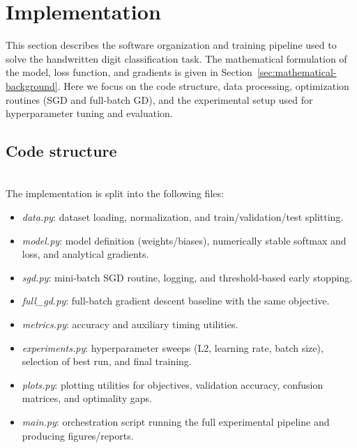 \section{Implementation}
\label{sec:implementation}

This section describes the software organization and training pipeline used to solve the handwritten digit classification task. The mathematical formulation of the model, loss function, and gradients is given in Section~\ref{sec:mathematical-background}. Here we focus on the code structure, data processing, optimization routines (SGD and full-batch GD), and the experimental setup used for hyperparameter tuning and evaluation.


\subsection{Code structure}\;\\
The implementation is split into the following files:
\begin{itemize}
    \item \emph{data.py}: dataset loading, normalization, and train/validation/test splitting.
    \item \emph{model.py}: model definition (weights/biases), numerically stable softmax and loss, and analytical gradients.
    \item \emph{sgd.py}: mini-batch SGD routine, logging, and threshold-based early stopping.
    \item \emph{full\_gd.py}: full-batch gradient descent baseline with the same objective.
    \item \emph{metrics.py}: accuracy and auxiliary timing utilities.
    \item \emph{experiments.py}: hyperparameter sweeps (L2, learning rate, batch size), selection of best run, and final training.
    \item \emph{plots.py}: plotting utilities for objectives, validation accuracy, confusion matrices, and optimality gaps.
    \item \emph{main.py}: orchestration script running the full experimental pipeline and producing figures/reports.
\end{itemize}


